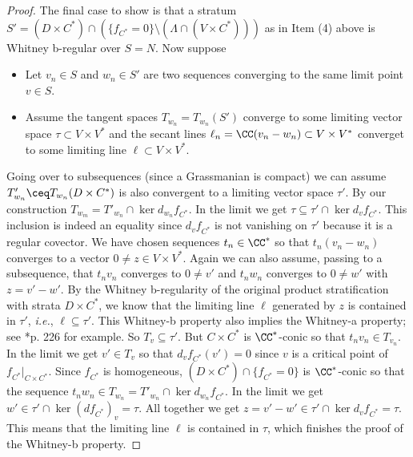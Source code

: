 \documentclass[11pt,letterpaper]{amsart}
\numberwithin{equation}{section}
\begin{document}
\begin{proof}
    The final case to show is that a stratum
    $S' = (D\times C^* )\cap \left(\{ f_{C^*} = 0 \} \setminus (\Lambda\cap (V\times C^*))\right)$ as in Item (4) above is Whitney b-regular over $S= N$.
Now suppose \begin{itemize}
        \item Let $v_n\in S$ and $w_n\in S'$ are two sequences converging to the same limit point $v\in S$.
        \item Assume the tangent spaces $T_{w_n} = T_{w_n}(S')$ converge to some limiting vector space $\tau \subset V\times V^*$ and the secant lines $\ell_n = \CC(v_n-w_n) \subset V\times V^*$ converget to some limiting line $\ell\subset V\times V^*$.
    \end{itemize}
Going over to subsequences (since a Grassmanian is compact) we can assume $T'_{w_n} \ceq T_{w_n}(D\times C^*)$ is also convergent to a limiting vector space $\tau'$.
By our construction $T_{w_m} = T'_{w_n}\cap \ker d_{w_n}f_{C^*}$.
In the limit we get $\tau \subseteq \tau'\cap \ker d_{v}f_{C^*}$.
This inclusion is indeed an equality since $d_vf_{C^*}$ is not vanishing on $\tau'$ because it is a regular covector.
We have chosen sequences $t_n\in \CC^*$ so that $t_n(v_n-w_n)$ converges to a vector $0\ne z \in V\times V^*$.
Again we can also assume, passing to a subsequence, that $t_n v_n$ converges to $0\ne v'$ and $t_n w_n$ converges to $0\ne w'$ with $z = v'-w'$.
By the Whitney b-regularity of the original product stratification with strata $D\times C^*$, we know that the limiting line $\ell$ generated by $z$ is contained in $\tau'$, {\it i.e.}, $\ell\subseteq \tau'$.
This Whitney-b property also implies the Whitney-a property; see \cite{Sch03}*{p. 226} for example.
So $T_{v} \subseteq \tau'$.
But $C\times C^*$ is $\CC^*$-conic so that $t_n v_n \in T_{v_n}$.
In the limit we get $v'\in T_{v}$ so that $d_vf_{C^*}(v') =0$ since $v$ is a critical point of $f_{C^*}\vert_{C\times C^*}$.
Since $f_{C^*}$ is homogeneous, $(D\times C^*)\cap \{ f_{C^*} =0 \}$ is $\CC^*$-conic so that the sequence $t_n w_n\in T_{w_n} = T'_{w_n} \cap \ker d_{w_n}f_{C^*}$. 
In the limit we get $w'\in \tau' \cap \ker (df_{C^*})_{v} = \tau$.
All together we get $z= v'-w'\in \tau' \cap \ker d_{v}f_{C^*} = \tau$.
This means that the limiting line $\ell$ is contained in $\tau$, which finishes the proof of the Whitney-b property.
\end{proof}
\end{document}
